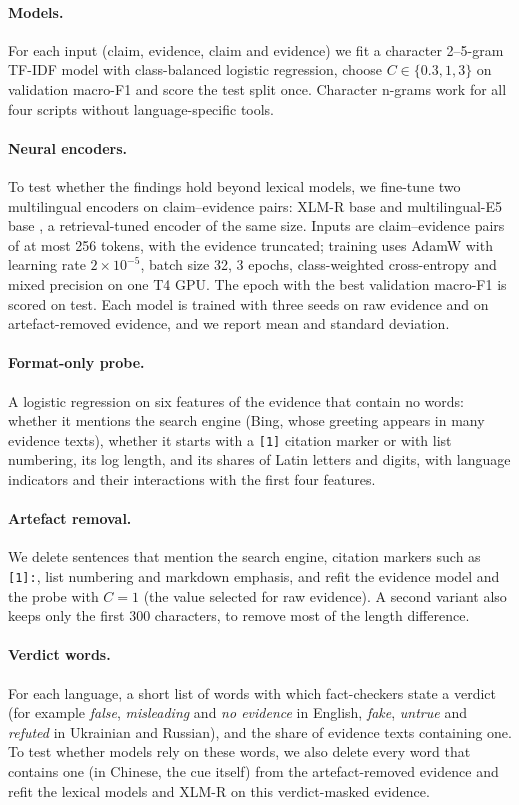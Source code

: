 \documentclass[11pt,a4paper]{article}
\newcommand{\code}[1]{\texttt{#1}}
\begin{document}
\paragraph{Models.} For each input (claim, evidence, claim and evidence) we fit a character 2--5-gram TF-IDF model with
class-balanced logistic regression, choose $C \in \{0.3, 1, 3\}$ on validation macro-F1 and score the test split once.
Character n-grams work for all four scripts without language-specific tools.

\paragraph{Neural encoders.} To test whether the findings hold beyond lexical models, we fine-tune two multilingual
encoders on claim--evidence pairs: XLM-R base \citep{conneau2020xlmr} and multilingual-E5 base
\citep{wang2024me5}, a retrieval-tuned encoder of the same size. Inputs are claim--evidence pairs of at most 256 tokens, with the evidence truncated; training uses AdamW with learning rate $2\times10^{-5}$, batch size 32, 3 epochs, class-weighted cross-entropy
and mixed precision on one T4 GPU. The epoch with the best validation macro-F1 is scored on test. Each model is
trained with three seeds on raw evidence and on artefact-removed evidence, and we report mean and standard deviation.

\paragraph{Format-only probe.} A logistic regression on six features of the evidence that contain no words: whether it
mentions the search engine (Bing, whose greeting appears in many evidence texts), whether it starts with a
\code{[1]} citation marker or with list numbering, its log length, and its shares of Latin letters and digits, with
language indicators and their interactions with the first four features.

\paragraph{Artefact removal.} We delete sentences that mention the search engine, citation markers such as
\code{[1]:}, list numbering and markdown emphasis, and refit the evidence model and the probe with $C=1$ (the value
selected for raw evidence). A second variant also keeps only the first 300 characters, to remove most of the length
difference.

\paragraph{Verdict words.} For each language, a short list of words with which fact-checkers state a verdict
(for example \textit{false}, \textit{misleading} and \textit{no evidence} in English, \textit{fake},
\textit{untrue} and \textit{refuted} in Ukrainian and Russian), and the share of evidence texts containing one.
To test whether models rely on these words, we also delete every word that contains one (in Chinese, the cue itself)
from the artefact-removed evidence and refit the lexical models and XLM-R on this verdict-masked evidence.
\end{document}
